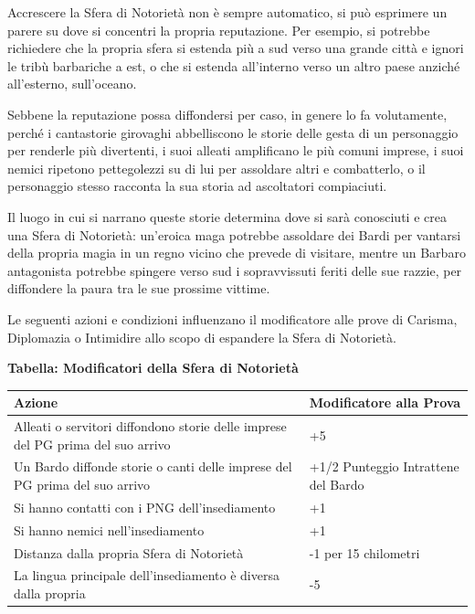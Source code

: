 \documentclass[a4paper,twoside,openany]{book}
\begin{document}
\begin{multicols}{2}
Accrescere la Sfera di Notorietà non è sempre automatico, si può esprimere un parere su dove si concentri la propria reputazione. Per esempio, si potrebbe richiedere che la propria sfera si estenda più a sud verso una grande città e ignori le tribù barbariche a est, o che si estenda all'interno verso un altro paese anziché all'esterno, sull'oceano.

Sebbene la reputazione possa diffondersi per caso, in genere lo fa volutamente, perché i cantastorie girovaghi abbelliscono le storie delle gesta di un personaggio per renderle più divertenti, i suoi alleati amplificano le più comuni imprese, i suoi nemici ripetono pettegolezzi su di lui per assoldare altri e combatterlo, o il personaggio stesso racconta la sua storia ad ascoltatori compiaciuti.

Il luogo in cui si narrano queste storie determina dove si sarà conosciuti e crea una Sfera di Notorietà: un'eroica maga potrebbe assoldare dei Bardi per vantarsi della propria magia in un regno vicino che prevede di visitare, mentre un Barbaro antagonista potrebbe spingere verso sud i sopravvissuti feriti delle sue razzie, per diffondere la paura tra le sue prossime vittime.

Le seguenti azioni e condizioni influenzano il modificatore alle prove di Carisma, Diplomazia o Intimidire allo scopo di espandere la Sfera di Notorietà.

\medskip

\textbf{Tabella: Modificatori della Sfera di Notorietà}

\end{multicols}

\medskip

\begin{tabularx}{0.95\textwidth}{Xl}
\textbf{Azione}&\textbf{Modificatore alla Prova}\\
\toprule
Alleati o servitori diffondono storie delle imprese del PG prima del suo arrivo&+5\\
Un Bardo diffonde storie o canti delle imprese del PG prima del suo arrivo&+1/2 Punteggio Intrattene del Bardo\\
Si hanno contatti con i PNG dell'insediamento&+1\\
Si hanno nemici nell'insediamento&+1\\
Distanza dalla propria Sfera di Notorietà&-1 per 15 chilometri\\
La lingua principale dell'insediamento è diversa dalla propria&-5\\
\end{tabularx}
\end{document}
